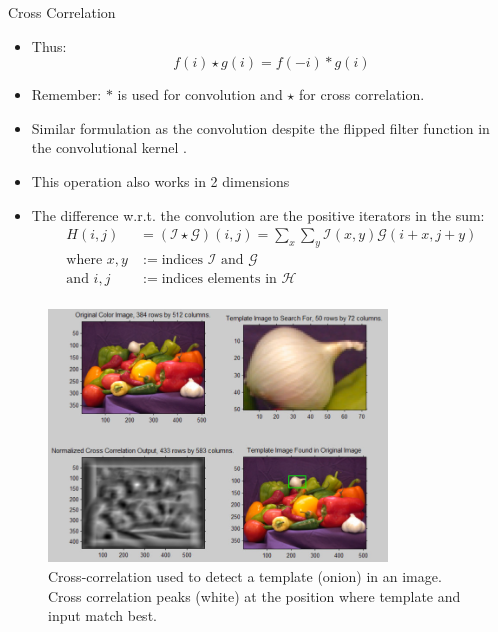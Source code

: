 \begin{vbframe}{Cross Correlation}
\begin{itemize}
        \item Thus:
            \begin{equation*}
                    f(i) \star g(i) = f(-i) \ast g(i)
            \end{equation*}
        \item Remember: $\ast$ is used for convolution and $\star$ for cross correlation.
        \item Similar formulation as the convolution despite the flipped filter function in the convolutional kernel .
    \end{itemize}
\framebreak
    \begin{itemize}
        \item This operation also works in 2 dimensions
        \item The difference w.r.t. the convolution are the positive iterators in the sum:
        \begin{equation*}
                    \begin{split}
                        H(i, j) &= (\mathcal{I} \star \mathcal{G})(i, j) = \sum_{x} \sum_{y} \mathcal{I}(x, y) \mathcal{G}(i+x, j+y) \\
                        \text{where } x, y &:= \text{indices $\mathcal{I}$ and $\mathcal{G}$} \\
                        \text{and } i, j &:= \text{indices elements in } \mathcal{H} \\
                        \end{split}
                \end{equation*}
    \end{itemize}
\framebreak
    \begin{figure}
        \centering
        \includegraphics[width=9cm]{plots/other/template_match.png}
        \caption{Cross-correlation used to detect a template (onion) in an image. Cross correlation peaks (white) at the position where template and input match best.}
    \end{figure}
\end{vbframe}

